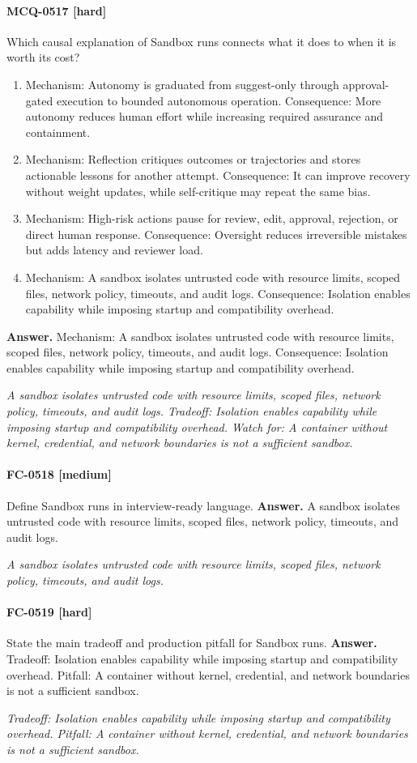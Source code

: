 \paragraph{MCQ-0517 [hard]} Which causal explanation of Sandbox runs connects what it does to when it is worth its cost?
\begin{enumerate}[label=\Alph*.]
\item Mechanism: Autonomy is graduated from suggest-only through approval-gated execution to bounded autonomous operation. Consequence: More autonomy reduces human effort while increasing required assurance and containment.
\item Mechanism: Reflection critiques outcomes or trajectories and stores actionable lessons for another attempt. Consequence: It can improve recovery without weight updates, while self-critique may repeat the same bias.
\item Mechanism: High-risk actions pause for review, edit, approval, rejection, or direct human response. Consequence: Oversight reduces irreversible mistakes but adds latency and reviewer load.
\item Mechanism: A sandbox isolates untrusted code with resource limits, scoped files, network policy, timeouts, and audit logs. Consequence: Isolation enables capability while imposing startup and compatibility overhead.
\end{enumerate}
\noindent\textbf{Answer.} Mechanism: A sandbox isolates untrusted code with resource limits, scoped files, network policy, timeouts, and audit logs. Consequence: Isolation enables capability while imposing startup and compatibility overhead.
\par\textit{A sandbox isolates untrusted code with resource limits, scoped files, network policy, timeouts, and audit logs. Tradeoff: Isolation enables capability while imposing startup and compatibility overhead. Watch for: A container without kernel, credential, and network boundaries is not a sufficient sandbox.}
\paragraph{FC-0518 [medium]} Define Sandbox runs in interview-ready language.
\noindent\textbf{Answer.} A sandbox isolates untrusted code with resource limits, scoped files, network policy, timeouts, and audit logs.
\par\textit{A sandbox isolates untrusted code with resource limits, scoped files, network policy, timeouts, and audit logs.}
\paragraph{FC-0519 [hard]} State the main tradeoff and production pitfall for Sandbox runs.
\noindent\textbf{Answer.} Tradeoff: Isolation enables capability while imposing startup and compatibility overhead. Pitfall: A container without kernel, credential, and network boundaries is not a sufficient sandbox.
\par\textit{Tradeoff: Isolation enables capability while imposing startup and compatibility overhead. Pitfall: A container without kernel, credential, and network boundaries is not a sufficient sandbox.}
